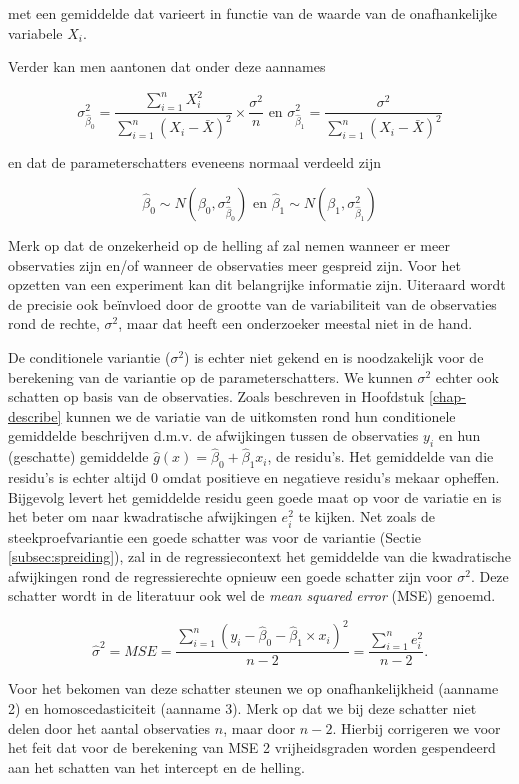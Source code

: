 \documentclass[
  12pt,dutch,coursenotes]{book}
\begin{document}
met een gemiddelde dat varieert in functie van de waarde van de onafhankelijke variabele \(X_i\).

Verder kan men aantonen dat onder deze aannames

\[\sigma^2_{\hat{\beta}_0}=\frac{\sum\limits_{i=1}^n X^2_i}{\sum\limits_{i=1}^n (X_i-\bar X)^2} \times\frac{\sigma^2}{n} \text{ en } \sigma^2_{\hat{\beta}_1}=\frac{\sigma^2}{\sum\limits_{i=1}^n (X_i-\bar X)^2}\]

en dat de parameterschatters eveneens normaal verdeeld zijn

\[\hat\beta_0 \sim N\left(\beta_0,\sigma^2_{\hat \beta_0}\right) \text{ en } \hat\beta_1 \sim N\left(\beta_1,\sigma^2_{\hat \beta_1}\right)\]

Merk op dat de onzekerheid op de helling af zal nemen wanneer er meer observaties zijn en/of wanneer de observaties meer gespreid zijn. Voor het opzetten van een experiment kan dit belangrijke informatie zijn. Uiteraard wordt de precisie ook beïnvloed door de grootte van de variabiliteit van de observaties rond de rechte, \(\sigma^2\), maar dat heeft een onderzoeker meestal niet in de hand.

De conditionele variantie (\(\sigma^2\)) is echter niet gekend en is noodzakelijk voor de berekening van de variantie op de parameterschatters. We kunnen \(\sigma^2\) echter ook schatten op basis van de observaties.
Zoals beschreven in Hoofdstuk \ref{chap-describe} kunnen we de variatie van de uitkomsten rond hun conditionele gemiddelde beschrijven d.m.v. de afwijkingen tussen de observaties \(y_i\) en hun (geschatte) gemiddelde \(\hat{g}(x)=\hat{\beta}_0+\hat{\beta}_1x_i\), de residu's.
Het gemiddelde van die residu's is echter altijd 0 omdat positieve en negatieve residu's mekaar
opheffen. Bijgevolg levert het gemiddelde residu geen goede maat op voor de variatie en is het beter om naar kwadratische afwijkingen \(e_i^2\) te kijken.
Net zoals de steekproefvariantie een goede schatter was voor de variantie (Sectie \ref{subsec:spreiding}), zal in de regressiecontext het gemiddelde van die kwadratische afwijkingen rond de regressierechte opnieuw een goede schatter zijn voor \(\sigma^2\). Deze schatter wordt in de literatuur ook wel de \emph{mean squared error} (MSE) genoemd.

\[\hat\sigma^2=MSE=\frac{\sum\limits_{i=1}^n \left(y_i-\hat\beta_0-\hat\beta_1\times x_i\right)^2}{n-2}=\frac{\sum\limits_{i=1}^n e^2_i}{n-2}.\]

Voor het bekomen van deze schatter steunen we op onafhankelijkheid (aanname 2) en homoscedasticiteit (aanname 3). Merk op dat we bij deze schatter niet delen door het aantal observaties \(n\), maar door \(n-2\). Hierbij corrigeren we voor het feit dat voor de berekening van MSE 2 vrijheidsgraden worden gespendeerd aan het schatten van het intercept en de helling.
\end{document}
